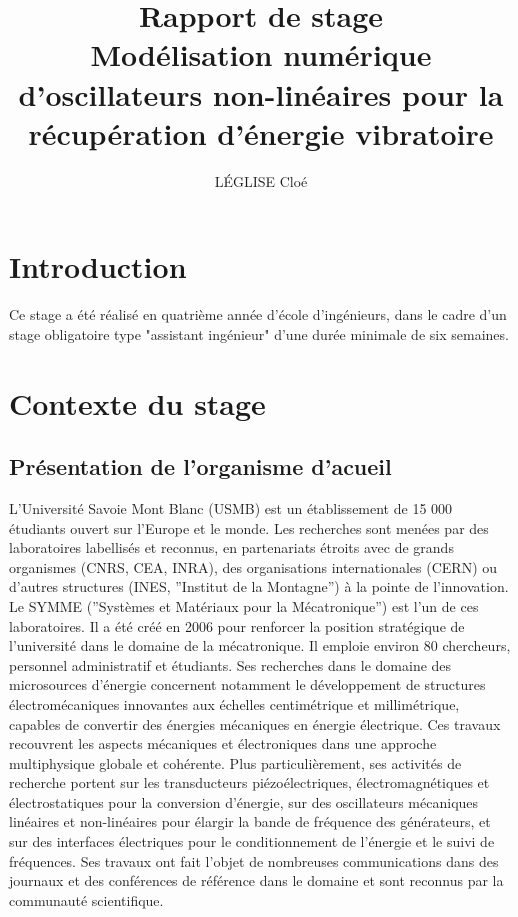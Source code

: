 \documentclass[a4paper, french, 12pt, titlepage]{report}
\title{Rapport de stage \\ Modélisation numérique d’oscillateurs non-linéaires pour
la récupération d’énergie vibratoire}
\author{LÉGLISE Cloé}
\begin{document}
\maketitle

\section{Introduction}


Ce stage a été réalisé en quatrième année d'école d'ingénieurs, dans le cadre d'un stage obligatoire type "assistant ingénieur" d'une durée minimale de six semaines. 

\section{Contexte du stage}

\subsection{Présentation de l'organisme d'acueil}

L’Université Savoie Mont Blanc (USMB) est un établissement de 15 000 étudiants ouvert sur l’Europe et le monde. Les recherches sont menées par des laboratoires labellisés et reconnus, en partenariats étroits avec de grands organismes (CNRS, CEA, INRA), des organisations internationales (CERN) ou d’autres structures (INES, ”Institut de la Montagne”) à la pointe de l’innovation. Le SYMME (”Systèmes et Matériaux pour la Mécatronique”) est l’un de ces laboratoires. Il a été créé en 2006 pour renforcer la position stratégique de l’université dans le domaine de la mécatronique. Il emploie environ 80 chercheurs, personnel administratif et étudiants. Ses recherches dans le domaine des microsources d’énergie concernent notamment le développement de structures électromécaniques innovantes aux échelles centimétrique et millimétrique, capables de convertir des énergies mécaniques en énergie électrique. Ces travaux recouvrent les aspects mécaniques et électroniques dans une approche multiphysique globale et cohérente. Plus particulièrement, ses activités de recherche portent sur les transducteurs piézoélectriques, électromagnétiques et électrostatiques pour la conversion d’énergie, sur des oscillateurs mécaniques linéaires et non-linéaires pour élargir la bande de fréquence des générateurs, et sur des interfaces électriques pour le conditionnement de l’énergie et le suivi de fréquences. Ses travaux ont fait l’objet de nombreuses communications dans des journaux et des conférences de référence dans le domaine et sont reconnus par la communauté scientifique.\\
\end{document}

